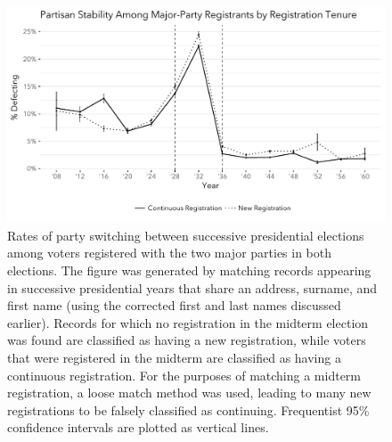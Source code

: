 \documentclass[11pt]{scrartcl}\usepackage[]{graphicx}\usepackage[]{color}
\makeatletter
\def\maxwidth{ %
  \ifdim\Gin@nat@width>\linewidth
    \linewidth
  \else
    \Gin@nat@width
  \fi
}
\newenvironment{knitrout}{}{} %
\makeatother
\begin{document}
\begin{knitrout}
\color{fgcolor}\begin{figure}

{\centering \includegraphics[width=\maxwidth]{figures/plots-prop14-1} 

}

\caption[Rates of party switching between successive presidential elections among voters registered with the two major parties in both elections]{Rates of party switching between successive presidential elections among voters registered with the two major parties in both elections. The figure was generated by matching records appearing in successive presidential years that share an address, surname, and first name (using the corrected first and last names discussed earlier). Records for which no registration in the midterm election was found are classified as having a new registration, while voters that were registered in the midterm are classified as having a continuous registration. For the purposes of matching a midterm registration, a loose match method was used, leading to many new registrations to be falsely classified as continuing. Frequentist 95\% confidence intervals are plotted as vertical lines.}\label{fig:prop14}
\end{figure}


\end{knitrout}

    
\end{document}
